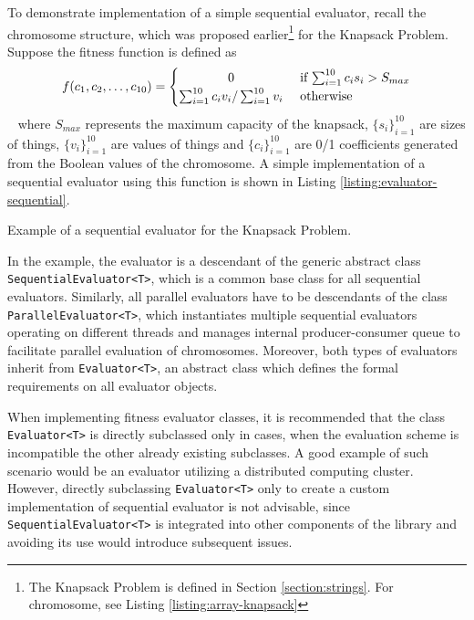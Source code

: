 To demonstrate implementation of a simple sequential evaluator, recall the chromosome structure, which was proposed earlier\footnote{The Knapsack Problem is defined in Section \ref{section:strings}. For chromosome, see Listing \ref{listing:array-knapsack}} for the Knapsack Problem. Suppose the fitness function is defined as
~
\begin{align}
	f(c_1, c_2, \dots, c_{10})
	=
	\begin{cases} 
		\hfill 0 \hfill & \text{ if $\sum_{i=1}^{10} c_i s_i>S_{max}$} \\
		\hfill \sum_{i=1}^{10} c_i v_i / \sum_{i=1}^{10} v_i \hfill & \text{ otherwise} \\
	\end{cases}
\end{align}
~
where $S_{max}$ represents the maximum capacity of the knapsack, $\{s_i\}_{i=1}^{10}$ are sizes of things, $\{v_i\}_{i=1}^{10}$ are values of things and $\{c_i\}_{i=1}^{10}$ are 0/1 coefficients generated from the Boolean values of the chromosome. A simple implementation of a sequential evaluator using this function is shown in Listing \ref{listing:evaluator-sequential}.

\begin{listing}[ht]
	\caption{Example of a sequential evaluator for the Knapsack Problem.}
	\label{listing:evaluator-sequential}
\end{listing}

In the example, the evaluator is a descendant of the generic abstract class \texttt{SequentialEvaluator<T>}, which is a common base class for all sequential evaluators. Similarly, all parallel evaluators have to be descendants of the class \texttt{ParallelEvaluator<T>}, which instantiates multiple sequential evaluators operating on different threads and manages internal producer-consumer queue to facilitate parallel evaluation of chromosomes. Moreover, both types of evaluators inherit from \texttt{Evaluator<T>}, an abstract class which defines the formal requirements on all evaluator objects.

When implementing fitness evaluator classes, it is recommended that the class \texttt{Evaluator<T>} is directly subclassed only in cases, when the evaluation scheme is incompatible the other already existing subclasses. A good example of such scenario would be an evaluator utilizing a distributed computing cluster. However, directly subclassing \texttt{Evaluator<T>} only to create a custom implementation of sequential evaluator is not advisable, since \texttt{SequentialEvaluator<T>} is integrated into other components of the library and avoiding its use would introduce subsequent issues.


